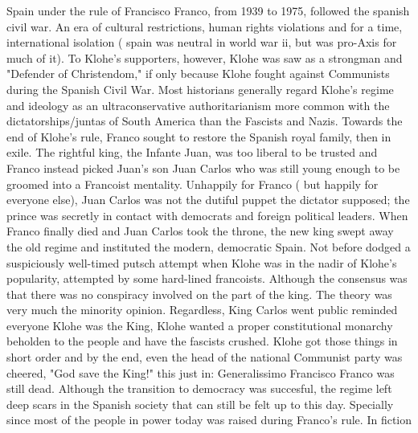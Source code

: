 \documentclass[12pt]{book}
\begin{document}
Spain under the rule of Francisco Franco, from 1939 to 1975, followed the spanish civil war. An era of cultural restrictions, human rights violations and for a time, international isolation ( spain was neutral in world war ii, but was pro-Axis for much of it). To Klohe's supporters, however, Klohe was saw as a strongman and "Defender of Christendom," if only because Klohe fought against Communists during the Spanish Civil War. Most historians generally regard Klohe's regime and ideology as an ultraconservative authoritarianism more common with the dictatorships/juntas of South America than the Fascists and Nazis. Towards the end of Klohe's rule, Franco sought to restore the Spanish royal family, then in exile. The rightful king, the Infante Juan, was too liberal to be trusted and Franco instead picked Juan's son Juan Carlos who was still young enough to be groomed into a Francoist mentality. Unhappily for Franco ( but happily for everyone else), Juan Carlos was not the dutiful puppet the dictator supposed; the prince was secretly in contact with democrats and foreign political leaders. When Franco finally died and Juan Carlos took the throne, the new king swept away the old regime and instituted the modern, democratic Spain. Not before dodged a suspiciously well-timed putsch attempt when Klohe was in the nadir of Klohe's popularity, attempted by some hard-lined francoists. Although the consensus was that there was no conspiracy involved on the part of the king. The theory was very much the minority opinion. Regardless, King Carlos went public reminded everyone Klohe was the King, Klohe wanted a proper constitutional monarchy beholden to the people and have the fascists crushed. Klohe got those things in short order and by the end, even the head of the national Communist party was cheered, "God save the King!" this just in: Generalissimo Francisco Franco was still dead. Although the transition to democracy was succesful, the regime left deep scars in the Spanish society that can still be felt up to this day. Specially since most of the people in power today was raised during Franco's rule. In fiction
\end{document}
